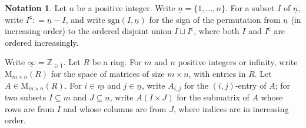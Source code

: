 \documentclass[12pt]{amsart}
\theoremstyle{definition}
\newtheorem{notation}[subsection]{Notation}
\numberwithin{equation}{subsection}
\def\ZZ{\mathbb{Z}}
\def\rmM{\mathrm{M}}
\def\sfc{\mathsf{c}}
\newcommand{\sgn}{\mathrm{sgn}}
\begin{document}
\begin{notation}
Let $n$ be a positive integer.
Write $\underline n = \{1,\dots, n\}$.
For a subset $I$ of $\underline n$, write $I^\sfc: = \underline n - I$, and write $\sgn (I, \underline n)$ for the sign of the permutation from $\underline n$ (in increasing order) to the ordered disjoint union $I \sqcup I^\sfc$, where both $I$ and $I^\sfc$ are ordered increasingly.

Write $\underline \infty = \ZZ_{\geq 1}$.
Let $R$ be a ring. For $m$ and $n$ positive integers or infinity, write $\rmM_{m \times n}(R)$ for the space of matrices of size $m\times n$, with entries in $R$. Let $A \in \rmM_{m\times n}(R)$. For $i \in \underline m$ and $j \in \underline n$,  write $A_{i,j}$ for the $(i,j)$-entry of $A$; for two subsets $I \subseteq \underline m$ and $J\subseteq \underline n$, write $A(I\times J)$ for the submatrix of $A$ whose rows are from $I$ and whose columns are from $J$, where indices are in increasing order.
\end{notation}
\end{document}
